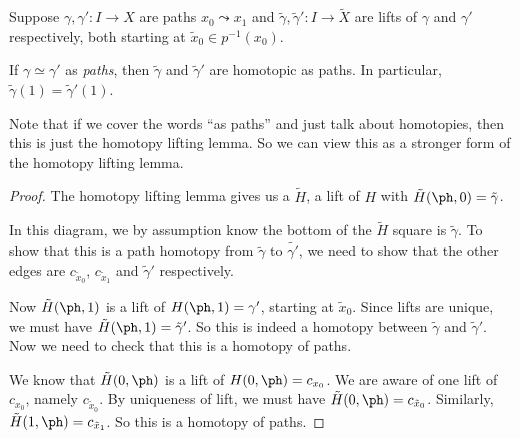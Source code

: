 \documentclass[a4paper]{article}
\begin{document}
\begin{cor}
  Suppose $\gamma, \gamma': I\to X$ are paths $x_0 \leadsto x_1$ and $\tilde{\gamma}, \tilde{\gamma}': I\to \tilde{X}$ are lifts of $\gamma$ and $\gamma'$ respectively, both starting at $\tilde{x}_0 \in p^{-1}(x_0)$.

  If $\gamma\simeq \gamma'$ as \emph{paths}, then $\tilde{\gamma}$ and $\tilde{\gamma}'$ are homotopic as paths. In particular, $\tilde{\gamma}(1) = \tilde{\gamma}'(1)$.
\end{cor}
Note that if we cover the words ``as paths'' and just talk about homotopies, then this is just the homotopy lifting lemma. So we can view this as a stronger form of the homotopy lifting lemma.

\begin{proof}
  The homotopy lifting lemma gives us a $\tilde{H}$, a lift of $H$ with $\tilde{H}(\ph, 0) = \tilde{\gamma}$.
  \begin{center}
  \end{center}
  In this diagram, we by assumption know the bottom of the $\tilde{H}$ square is $\tilde{\gamma}$. To show that this is a path homotopy from $\tilde{\gamma}$ to $\tilde{\gamma'}$, we need to show that the other edges are $c_{\tilde{x}_0}$, $c_{\tilde{x}_1}$ and $\tilde{\gamma}'$ respectively.

  Now $\tilde{H}(\ph, 1)$ is a lift of $H(\ph, 1) = \gamma'$, starting at $\tilde{x}_0$. Since lifts are unique, we must have $\tilde{H}(\ph, 1) = \tilde{\gamma}'$. So this is indeed a homotopy between $\tilde{\gamma}$ and $\tilde{\gamma}'$. Now we need to check that this is a homotopy of paths.

  We know that $\tilde{H}(0, \ph)$ is a lift of $H(0, \ph) = c_{x_0}$. We are aware of one lift of $c_{x_0}$, namely $c_{\tilde{x}_0}$. By uniqueness of lift, we must have $\tilde{H}(0, \ph) = c_{\tilde{x}_0}$. Similarly, $\tilde{H}(1, \ph) = c_{\tilde{x}_1}$. So this is a homotopy of paths.
\end{proof}
\end{document}
